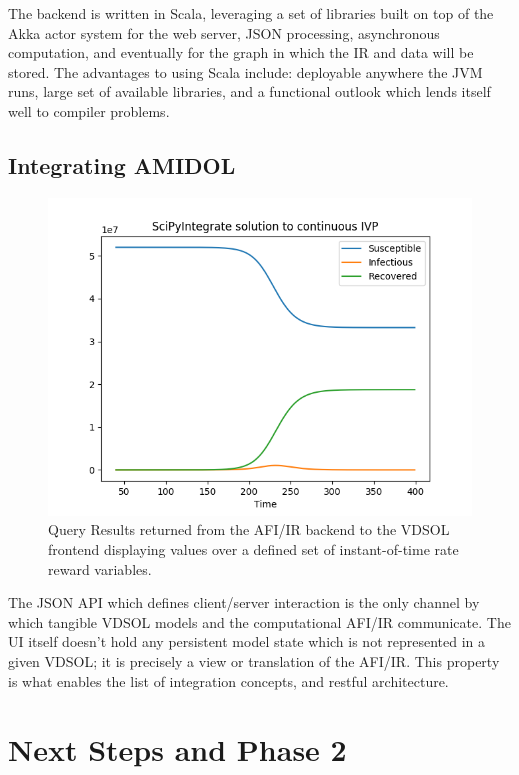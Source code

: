 \documentclass[11pt]{article}
\begin{document}
The backend is written in Scala, leveraging a set of libraries built on top of the Akka actor system for the web server, JSON processing, asynchronous computation, and eventually for the graph in which the IR and data will be stored. The advantages to using Scala include: deployable anywhere the JVM runs, large set of available libraries, and a functional outlook which lends itself well to compiler problems.

\subsection{Integrating AMIDOL}

\begin{figure}
\includegraphics[width=\textwidth]{figs/QueryResult.png}
\caption{Query Results returned from the AFI/IR backend to the VDSOL frontend displaying values over a defined set of instant-of-time rate reward variables.}
\label{Fig:QueryResult}
\end{figure}

The JSON API which defines client/server interaction is the only channel by which tangible VDSOL models and the computational AFI/IR communicate. The UI itself doesn't hold any persistent model state which is not represented in a given VDSOL; it is precisely a view or translation of the AFI/IR. This property is what enables the list of integration concepts, and restful architecture.

\section{Next Steps and Phase 2}
\end{document}
